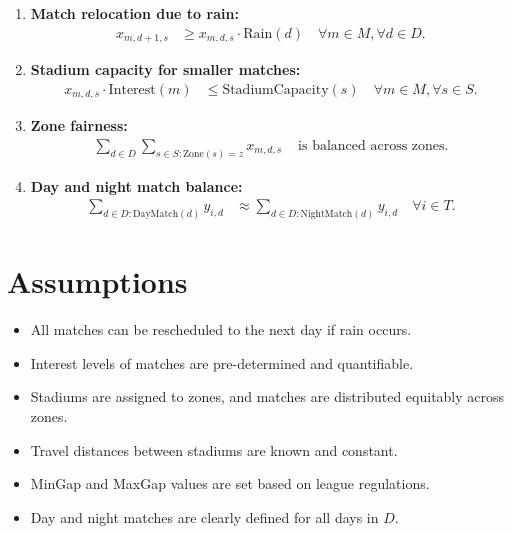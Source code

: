 \documentclass[a4paper, 12pt]{article}
\begin{document}
\begin{enumerate}
    \item \textbf{Match relocation due to rain:}
    \begin{align*}
        x_{m,d+1,s} &\geq x_{m,d,s} \cdot \text{Rain}(d) \quad \forall m \in M, \forall d \in D.
    \end{align*}

    \item \textbf{Stadium capacity for smaller matches:}
    \begin{align*}
        x_{m,d,s} \cdot \text{Interest}(m) &\leq \text{StadiumCapacity}(s) \quad \forall m \in M, \forall s \in S.
    \end{align*}

    \item \textbf{Zone fairness:}
    \begin{align*}
        \sum_{d \in D} \sum_{s \in S: \text{Zone}(s) = z} x_{m,d,s} &\text{ is balanced across zones.}
    \end{align*}

    \item \textbf{Day and night match balance:}
    \begin{align*}
        \sum_{d \in D: \text{DayMatch}(d)} y_{i,d} &\approx \sum_{d \in D: \text{NightMatch}(d)} y_{i,d} \quad \forall i \in T.
    \end{align*}
\end{enumerate}

\section*{Assumptions}
\begin{itemize}
    \item All matches can be rescheduled to the next day if rain occurs.
    \item Interest levels of matches are pre-determined and quantifiable.
    \item Stadiums are assigned to zones, and matches are distributed equitably across zones.
    \item Travel distances between stadiums are known and constant.
    \item MinGap and MaxGap values are set based on league regulations.
    \item Day and night matches are clearly defined for all days in $D$.
\end{itemize}
\end{document}
